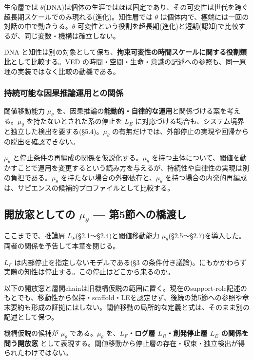 生命層では $\theta$(DNA)は個体の生涯ではほぼ固定であり、その可変性は世代を跨ぐ超長期スケールでのみ現れる(進化)。知性層では $\theta$ は個体内で、極端には一回の対話の中で動きうる。$\theta$-可変性という役割を超長期(進化)と短期(認知)で比較するが、同じ変数・機構は確立しない。

DNA と知性は別の対象として保ち、\textbf{拘束可変性の時間スケールに関する役割類比}として比較する。VED の時間・空間・生命・意識の記述への参照も、同一原理の実装ではなく比較の動機である。

\subsubsection{持続可能な因果推論運用との関係}


閾値移動能力 $\mu_\theta$ を、因果推論の\textbf{能動的・自律的な運用}と関係づける案を考える。$\mu_\theta$ を持たないとされた系の停止を $L_E$ に対応づける場合も、システム境界と独立した検出を要する(\S{}5.4)。$\mu_\theta$ の有無だけでは、外部停止の実現や回帰からの脱出を確認できない。

$\mu_\theta$ と停止条件の再編成の関係を仮説化する。$\mu_\theta$ を持つ主体について、閾値を動かすことで運用を変更するという読み方を与えるが、持続性や自律性の実現は別の負担である。$\mu_\theta$ を持たない場合の外部依存と、$\mu_\theta$ を持つ場合の内発的再編成は、サピエンスの候補的プロファイルとして比較する。

\bigskip


\subsection{開放窓としての $\mu_\theta$ — 第5節への橋渡し}


ここまでで、推論層 $L_F$(\S{}2.1〜\S{}2.4)と閾値移動能力 $\mu_\theta$(\S{}2.5〜\S{}2.7)を導入した。両者の関係を予告して本章を閉じる。

$L_F$ は内部停止を指定しないモデルである(\S{}3 の条件付き議論)。にもかかわらず実際の知性は停止する。この停止はどこから来るのか。

以下の開放窓と層間chainは旧機構仮説の範囲に置く。現在のsupport-role記述のもとでも、移動性から保持・scaffold・LEを認定せず、後続の第5節への参照や章末要約も形成の証拠にはしない。閾値移動の局所的な定義と式は、そのまま別の記述として保つ。

機構仮説の候補が $\mu_\theta$ である。$\mu_\theta$ を、\textbf{$L_F$・ログ層 $L_R$・創発停止層 $L_E$ の関係を問う開放窓} として表現する。閾値移動から停止層の存在・収束・独立検出が得られたわけではない。

